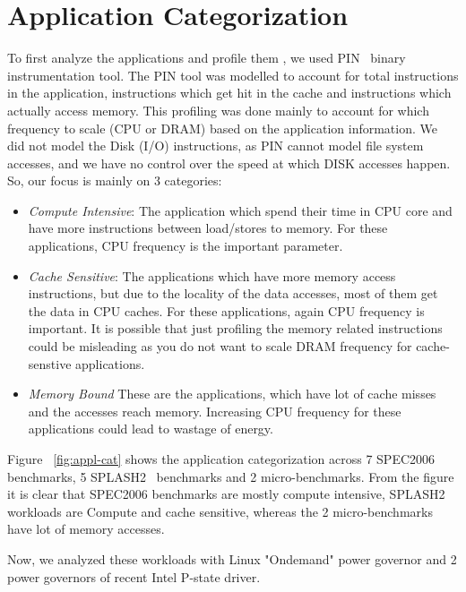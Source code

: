 \section{Application Categorization}\label{sec:appl}

To first analyze the applications and profile them , we used PIN~\cite{pin} binary instrumentation tool. The PIN tool was modelled to account for total instructions in the application, instructions which get hit in the cache and instructions which actually access memory. 
This profiling was done mainly to account for
which frequency to scale (CPU or DRAM) based on the application information. 
We did not model the Disk (I/O) instructions, as PIN cannot model file system accesses, and
we have no control over the speed at which DISK accesses happen. So, our focus is
mainly on 3 categories:

\begin{itemize} 
\item \textit{Compute Intensive}: The application which spend their time in CPU core and have
more instructions between load/stores to memory. For these applications, CPU
frequency is the important parameter.
\item \textit{Cache Sensitive}: The applications which have more memory access instructions,
but due to the locality of the data accesses, most of them get the data in CPU caches.
For these applications, again CPU frequency is important. It is possible that just
profiling the memory related instructions could be misleading as you do not want to
scale DRAM frequency for cache-senstive applications.
\item \textit{Memory Bound} These are the applications, which have lot of cache misses
and the accesses reach memory. Increasing CPU frequency for these applications could 
lead to wastage of energy. 
\end{itemize}

Figure ~\ref{fig:appl-cat} shows the application categorization across 7 SPEC2006~\cite{spec2006} benchmarks, 5 SPLASH2~\cite{splash2} benchmarks and 2 micro-benchmarks. From the figure it is clear that
SPEC2006 benchmarks are mostly compute intensive, SPLASH2 workloads are Compute and cache sensitive, whereas the 2 micro-benchmarks 
have lot of memory accesses.

Now, we analyzed these workloads with Linux "Ondemand" power governor and 2 power governors of recent Intel P-state driver. 


